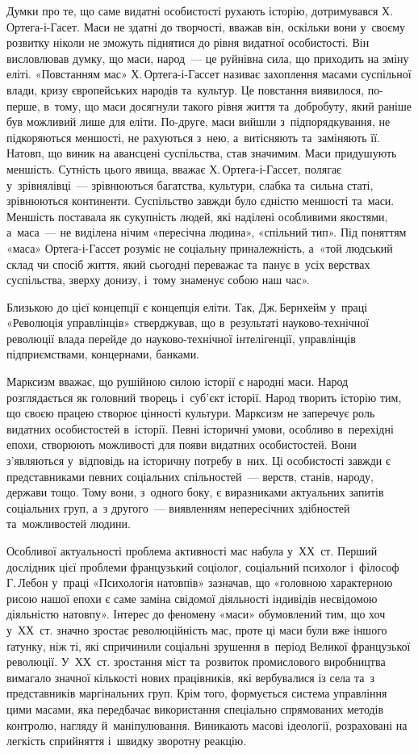 \documentclass[a5paper,oneside,DIV=12,12pt,headings=small]{scrartcl}
\begin{document}
		Думки про те, що саме видатні особистості рухають історію, дотримувався Х.\,Ортега-і-Гасет. Маси не здатні до творчості, вважав він, оскільки вони у~своєму розвитку ніколи не зможуть піднятися до рівня видатної особистості. Він висловлював думку, що маси, народ~— це руйнівна сила, що приходить на зміну еліті. «Повстанням мас» Х.\,Ортега-і-Гассет називає захоплення масами суспільної влади, кризу європейських народів та~культур. Це повстання виявилося, по-перше, в~тому, що маси досягнули такого рівня життя та~добробуту, який раніше був можливий лише для еліти. По-друге, маси вийшли з~підпорядкування, не підкоряються меншості, не рахуються з~нею, а~витісняють та~заміняють її. Натовп, що виник на авансцені суспільства, став значимим. Маси придушують меншість. Сутність цього явища, вважає Х.\,Ортега-і-Гассет, полягає у~зрівнялівці~— зрівнюються багатства, культури, слабка та~сильна статі, зрівнюються континенти. Суспільство завжди було єдністю меншості та~маси. Меншість поставала як сукупність людей, які наділені особливими якостями, а~маса~— не виділена нічим «пересічна людина», «спільний тип». Під поняттям «маса» Ортега-і-Гассет розуміє не соціальну приналежність, а~«той людський склад чи спосіб життя, який сьогодні переважає та~панує в~усіх верствах суспільства, зверху донизу, і~тому знаменує собою наш час».
		
		Близькою до цієї концепції є концепція еліти. Так, Дж.\,Бернхейм у~праці «Революція управлінців» стверджував, що в~результаті науково-технічної революції влада перейде до науково-технічної інтелігенції, управлінців підприємствами, концернами, банками.
		
		Марксизм вважає, що рушійною силою історії є народні маси. Народ розглядається як головний творець і~суб'\-єкт історії. Народ творить історію тим, що своєю працею створює цінності культури. Марксизм не заперечує роль видатних особистостей в~історії. Певні історичні умови, особливо в~перехідні епохи, створюють можливості для появи видатних особистостей. Вони з'являються у~відповідь на історичну потребу в~них. Ці особистості завжди є представниками певних соціальних спільностей~— верств, станів, народу, держави тощо. Тому вони, з~одного боку, є виразниками актуальних запитів соціальних груп, а~з другого~— виявленням непересічних здібностей та~можливостей людини.
		
		Особливої актуальності проблема активності мас набула у~ХХ~ст. Перший дослідник цієї проблеми французький соціолог, соціальний психолог і~філософ Г.\,Лебон у~праці «Психологія натовпів» зазначав, що «головною характерною рисою нашої епохи є саме заміна свідомої діяльності індивідів несвідомою діяльністю натовпу». Інтерес до феномену «маси» обумовлений тим, що хоч у~ХХ~ст. значно зростає революційність мас, проте ці маси були вже іншого ґатунку, ніж ті, які спричинили соціальні зрушення в~період Великої французької революції. У~ХХ~ст. зростання міст та~розвиток промислового виробництва вимагало значної кількості нових працівників, які вербувалися із села та~з представників маргінальних груп. Крім того, формується система управління цими масами, яка передбачає використання спеціально спрямованих методів контролю, нагляду й~маніпулювання. Виникають масові ідеології, розраховані на легкість сприйняття і~швидку зворотну реакцію.
		
\end{document}
